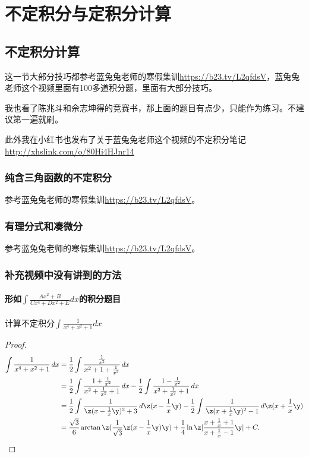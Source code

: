\chapter{不定积分与定积分计算}


\section{不定积分计算}

这一节大部分技巧都参考蓝兔兔老师的寒假集训\url{https://b23.tv/L2qfdsV}，蓝兔兔老师这个视频里面有100多道积分题，里面有大部分技巧。

我也看了陈兆斗和佘志坤得的竞赛书，那上面的题目有点少，只能作为练习。不建议第一遍就刷。

此外我在小红书也发布了关于蓝兔兔老师这个视频的不定积分笔记\url{http://xhslink.com/o/80Hi4HJnr14 }


\subsection{纯含三角函数的不定积分}

参考蓝兔兔老师的寒假集训\url{https://b23.tv/L2qfdsV}。

\subsection{有理分式和凑微分}

参考蓝兔兔老师的寒假集训\url{https://b23.tv/L2qfdsV}。

\subsection{补充视频中没有讲到的方法}

\subsubsection{形如$\int \frac{Ax^2 + B }{Cx^4 + Dx^2 + E} dx $的积分题目}

\begin{example}
计算不定积分$ \displaystyle \int \frac{1}{x^4 + x^2 + 1} dx $
\end{example}
\begin{proof}
\begin{align*}
\int \frac{1}{x^4 + x^2 + 1} \, dx 
&= \frac{1}{2} \int \frac{\frac{1}{x^2}}{x^2 + 1 + \frac{1}{x^2}} \, dx  \\
&= \frac{1}{2} \int \frac{1 + \frac{1}{x^2}}{x^2 + \frac{1}{x^2} + 1} \, dx 
   - \frac{1}{2} \int \frac{1 - \frac{1}{x^2}}{x^2 + \frac{1}{x^2} + 1} \, dx \\
&= \frac{1}{2} \int \frac{1}{\z(x - \frac{1}{x}\y)^2 + 3} \, d\z(x - \frac{1}{x}\y) 
   - \frac{1}{2} \int \frac{1}{\z(x + \frac{1}{x}\y)^2 - 1} \, d\z(x + \frac{1}{x}\y) \\
&= \frac{\sqrt{3}}{6} \arctan \z(\frac{1}{\sqrt{3}} \z(x - \frac{1}{x}\y)\y) 
   + \frac{1}{4} \ln \z|\frac{x + \frac{1}{x} + 1}{x + \frac{1}{x} - 1}\y| + C.
\end{align*}
\end{proof}


